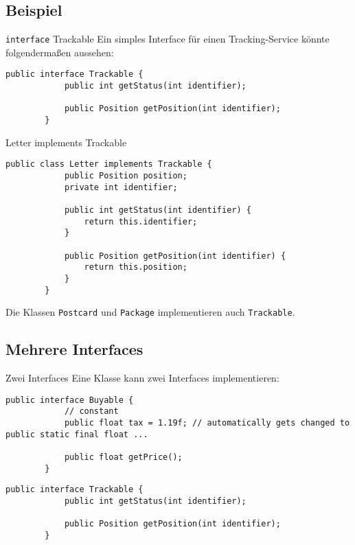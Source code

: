 \subsection{Beispiel}
\begin{frame}[fragile]{\texttt{interface} Trackable}
    Ein simples Interface für einen Tracking-Service könnte folgendermaßen aussehen:
    \begin{lstlisting}[gobble=8]
        public interface Trackable {
            public int getStatus(int identifier);
            
            public Position getPosition(int identifier);
        }
	\end{lstlisting}
\end{frame}
\begin{frame}[fragile]{Letter implements Trackable}
    \begin{lstlisting}[gobble=8]
        public class Letter implements Trackable {
            public Position position;
            private int identifier;
        
            public int getStatus(int identifier) {
                return this.identifier;
            }
            
            public Position getPosition(int identifier) {
                return this.position;
            }
        }
	\end{lstlisting}
	Die Klassen \texttt{Postcard} und \texttt{Package} implementieren auch \texttt{Trackable}.
\end{frame}

\subsection{Mehrere Interfaces}
\begin{frame}[fragile]{Zwei Interfaces}
    Eine Klasse kann zwei Interfaces implementieren:
	\vfill
    \begin{lstlisting}[gobble=8]
        public interface Buyable {
            // constant
            public float tax = 1.19f; // automatically gets changed to public static final float ...
        
            public float getPrice();
        }
	\end{lstlisting}
    \begin{lstlisting}[gobble=8]
        public interface Trackable {
            public int getStatus(int identifier);
            
            public Position getPosition(int identifier);
        }
	\end{lstlisting}
\end{frame}

